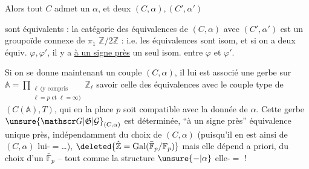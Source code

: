 
Alors tout $C$ admet un $\alpha$, et deux $(C,\alpha),(C',\alpha')$



sont équivalents : la catégorie des équivalences
de $(C,\alpha)$ avec $(C',\alpha')$ est un groupoïde connexe de
$\pi_1$ $\mathbb Z/2\mathbb Z$ : i.e.   les équivalences sont
isom, et si on a deux équiv. $\varphi,\varphi'$, il y a \uline{à un
signe près} un seul isom. entre $\varphi$ et $\varphi'$.

Si on se donne maintenant un couple $(C,\alpha)$,
il lui est associé une  gerbe sur $\mathbb A=\prod_{\substack{\ell\ (\text{y compris}\\\ell=p\text{ et }\ell=\infty)}}\mathbb Z_\ell$
 savoir celle des équivalences  avec le  couple
type de $(C(\mathbb A),T)$, qui en la place $p$ soit
compatible avec la donnée de $\alpha$. Cette gerbe
$\unsure{\mathscr G|\mathfrak G|\mathcal G}_{(C,\alpha)}$ est déterminée, ``à un signe près''  équivalence
unique près, indépendamment du choix de $(C,\alpha)$
(puisqu'il en est ainsi de $(C,\alpha)$ lui-$=$\ldots), 
$\deleted{\hat{\mathbb Z}=\mathrm{Gal}(\bar{\mathbb F}_p/\mathbb F_p)}$  mais elle dépend
a priori,  du choix d'un $\bar{\mathbb F}_p$  -- tout comme la structure $\unsure{-|\alpha}$ elle-$=$ !


